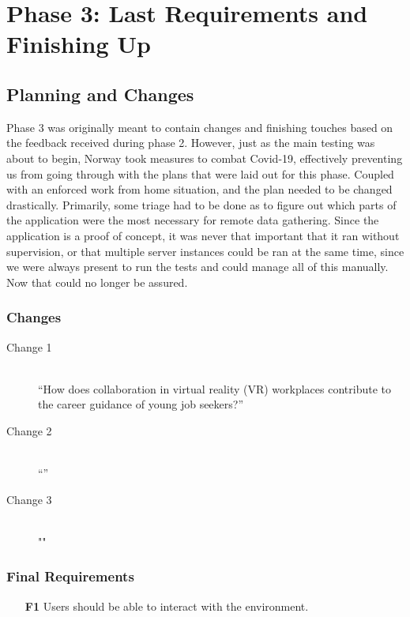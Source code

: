 
\chapter{Phase 3: Last Requirements and Finishing Up} \label{chap:7}
\label{chap:phase3}

\section{Planning and Changes}
Phase 3 was originally meant to contain changes and finishing touches based on the feedback received during phase 2. However, just as the main testing was about to begin, Norway took measures to combat Covid-19, effectively preventing us from going through with the plans that were laid out for this phase. Coupled with an enforced work from home situation, and the plan needed to be changed drastically. Primarily, some triage had to be done as to figure out which parts of the application were the most necessary for remote data gathering. Since the application is a proof of concept, it was never that important that it ran without supervision, or that multiple server instances could be ran at the same time, since we were always present to run the tests and could manage all of this manually. Now that could no longer be assured. 

\subsection{Changes}
\begin{description}
    \item [Change 1]\hfill \\
    “How does collaboration in virtual reality (VR) workplaces contribute to the career guidance of young job seekers?” 
    \item [Change 2]\hfill \\
    “”
    \item [Change 3]\hfill \\
    ""
\end{description}

\subsection{Final Requirements}
\begin{enumerate}
  \item [\textbf{F1}] Users should be able to interact with the environment.
\end{enumerate}



